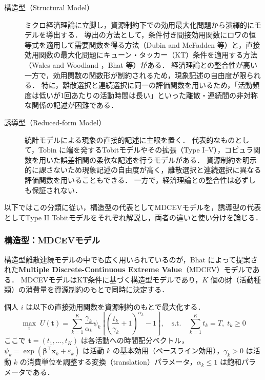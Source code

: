 \begin{description}
  \item[構造型（Structural Model）]
    ミクロ経済理論に立脚し，資源制約下での効用最大化問題から演繹的にモデルを導出する．
    導出の方法として，条件付き間接効用関数にロワの恒等式を適用して需要関数を得る方法（Dubin and McFadden \cite{DubinMcFadden1984} 等）と，直接効用関数の最大化問題にキューン・タッカー（KT）条件を適用する方法（Wales and Woodland \cite{WalesWoodland1983}，Bhat \cite{BHAT2008274} 等）がある．
    経済理論との整合性が高い一方で，効用関数の関数形が制約されるため，現象記述の自由度が限られる．
    特に，離散選択と連続選択に同一の評価関数を用いるため，「活動頻度は低いが1回あたりの活動時間は長い」といった離散・連続間の非対称な関係の記述が困難である．
  \item[誘導型（Reduced-form Model）]
    統計モデルによる現象の直接的記述に主眼を置く．
    代表的なものとして，Tobin \cite{Tobin1958} に端を発するTobitモデルやその拡張（Type I--V），コピュラ関数を用いた誤差相関の柔軟な記述を行うモデルがある．
    資源制約を明示的に課さないため現象記述の自由度が高く，離散選択と連続選択に異なる評価関数を用いることもできる．
    一方で，経済理論との整合性は必ずしも保証されない．
\end{description}

以下ではこの分類に従い，構造型の代表としてMDCEVモデルを，誘導型の代表としてType II Tobitモデルをそれぞれ解説し，両者の違いと使い分けを論じる．

\subsubsection{構造型：MDCEVモデル}

構造型離散連続モデルの中でも広く用いられているのが，Bhat \cite{BHAT2008274} によって提案された\textbf{Multiple Discrete-Continuous Extreme Value}（MDCEV）モデルである．
MDCEVモデルはKT条件に基づく構造型モデルであり，$K$ 個の財（活動種類）の消費量を資源制約のもとで同時に決定する．

個人 $i$ は以下の直接効用関数を資源制約のもとで最大化する．
\begin{equation}\label{eq:mdcev_utility}
  \max_{\bm{t}} \; U(\bm{t}) = \sum_{k=1}^{K} \frac{\gamma_k}{\alpha_k} \psi_k \left[ \left( \frac{t_k}{\gamma_k} + 1 \right)^{\alpha_k} - 1 \right], \quad \text{s.t.} \quad \sum_{k=1}^{K} t_k = T, \; t_k \geq 0
\end{equation}
ここで $\bm{t} = (t_1, \dots, t_K)$ は各活動への時間配分ベクトル，$\psi_k = \exp(\bm{\beta}^\top \bm{x}_k + \varepsilon_k)$ は活動 $k$ の基本効用（ベースライン効用），$\gamma_k > 0$ は活動 $k$ の消費単位を調整する変換（translation）パラメータ，$\alpha_k \le 1$ は飽和パラメータである．

